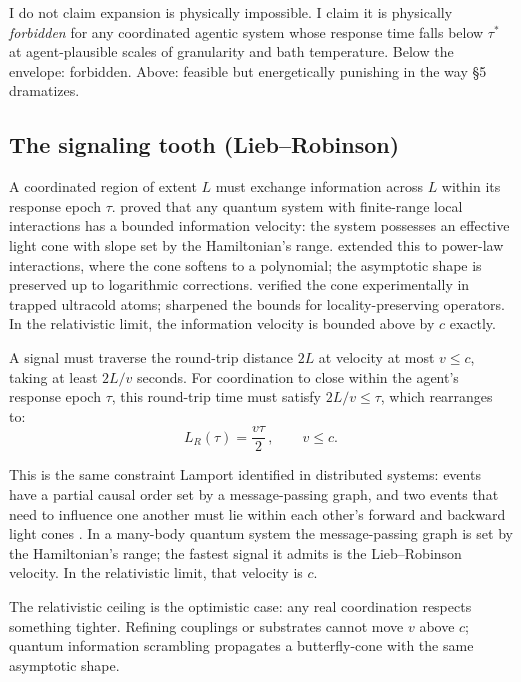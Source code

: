 \documentclass[11pt,twocolumn]{article}
\newcommand{\LR}{L_R}
\newcommand{\taustar}{{\tau^{*}}}
\begin{document}
I do not claim expansion is physically impossible. I claim it is physically
\emph{forbidden} for any coordinated agentic system whose response time
falls below $\taustar$ at agent-plausible scales of granularity and bath
temperature. Below the envelope: forbidden. Above: feasible but
energetically punishing in the way \S 5 dramatizes.

\subsection{The signaling tooth (Lieb--Robinson)}
\label{sec:Lsignal}

A coordinated region of extent $L$ must exchange information across $L$
within its response epoch $\tau$. \citet{LiebRobinson1972} proved that any
quantum system with finite-range local interactions has a bounded
information velocity: the system possesses an effective light cone with
slope set by the Hamiltonian's range. \citet{FossFeig2015} extended this
to power-law interactions, where the cone softens to a polynomial; the
asymptotic shape is preserved up to logarithmic corrections.
\citet{Cheneau2012} verified the cone experimentally in trapped ultracold
atoms; \citet{Tran2021} sharpened the bounds for locality-preserving
operators. In the relativistic limit, the information velocity is bounded
above by $c$ exactly.

A signal must traverse the round-trip distance $2L$ at velocity at most
$v \le c$, taking at least $2L/v$ seconds. For coordination to close
within the agent's response epoch $\tau$, this round-trip time must
satisfy $2L/v \le \tau$, which rearranges to:
\begin{equation}
\boxed{\;\LR(\tau) = \frac{v\tau}{2}\,, \qquad v \le c.\;}
\label{eq:LR}
\end{equation}

This is the same constraint Lamport identified in distributed systems:
events have a partial causal order set by a message-passing graph, and
two events that need to influence one another must lie within each other's
forward and backward light cones \citep{Lamport1978}. In a many-body
quantum system the message-passing graph is set by the Hamiltonian's
range; the fastest signal it admits is the Lieb--Robinson velocity. In the
relativistic limit, that velocity is $c$.

The relativistic ceiling is the optimistic case: any real coordination
respects something tighter. Refining couplings or substrates cannot move
$v$ above $c$; quantum information scrambling propagates a butterfly-cone
with the same asymptotic shape.
\end{document}
